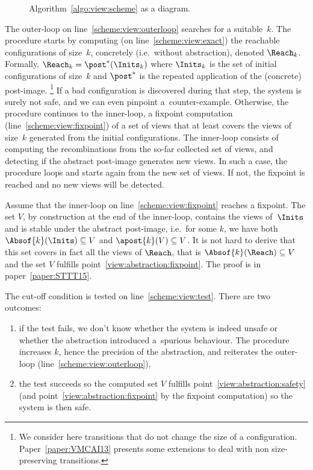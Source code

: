 %
\noindent%
\begin{wrapfigure}{l}[0pt]{0.65\linewidth}
  \caption{Algorithm~\ref{algo:view:scheme} as a diagram.}
  \label{algo:view:diagram}
  \smallskip
\end{wrapfigure}
%
The outer-loop on line~\ref{scheme:view:outerloop} searches for a
suitable~$k$.
%
The procedure starts by computing (on line~\ref{scheme:view:exact})
the reachable configurations of size~$k$, concretely (i.e.\ without
abstraction), denoted $\Reach_k$.
%
Formally, $\Reach_k = \post^{*}(\Inits_k)$ where $\Inits_k$
is the set of initial configurations of size~$k$ and $\post^{*}$ is
the repeated application of the (concrete) post-image.%
\footnote{We consider here transitions that do not change the size of
  a configuration. Paper~\ref{paper:VMCAI13} presents some extensions
  to deal with non size-preserving transitions.} %
%
If a bad configuration is discovered during that step, the system is
surely not safe, and we can even pinpoint a~counter-example.
%
%
Otherwise, the procedure continues to the inner-loop, a fixpoint
computation (line~\ref{scheme:view:fixpoint}) of a set of views that
at least covers the views of size~$k$ generated from the initial
configurations.
%
The inner-loop consists of computing the recombinations from the
so-far collected set of views, and detecting if the abstract
post-image generates new views. In such a case, the procedure loops
and starts again from the new set of views. If not, the fixpoint is
reached and no new views will be detected.

Assume that the inner-loop on line~\ref{scheme:view:fixpoint} reaches
a fixpoint. The set $V$, by construction at the end of the inner-loop,
contains the views of~$\Inits$ and is stable under the abstract
post-image, i.e.\ for some $k$, we have both
$\Absof{k}(\Inits)\subseteq V$ and $\apost{k}(V)\subseteq V$.
%
It is not hard to derive that this set covers in fact all the views of
$\Reach$, that is $\Absof{k}(\Reach)\subseteq V$ and the set $V$
fulfills point~\ref{view:abstraction:fixpoint}.
%
The proof is in paper~\ref{paper:STTT15}.


The \mbox{cut-off} condition %
is tested on line~\ref{scheme:view:test}. %
There are two outcomes: %
\begin{enumerate}[label=(\alph*)]
\item if the test fails, we don't know whether the system is indeed
  unsafe or whether the abstraction introduced a~spurious
  behaviour. The procedure increases $k$, hence the precision of the
  abstraction, and reiterates the outer-loop
  (line~\ref{scheme:view:outerloop}),
\item the test succeeds so the computed set $V$ fulfills
  point~\ref{view:abstraction:safety} %
  (and point~\ref{view:abstraction:fixpoint} by the fixpoint
  computation) so the system is then safe. %
\end{enumerate}

